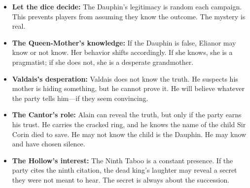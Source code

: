 \begin{itemize}
  \item \textbf{Let the dice decide:} The Dauphin's legitimacy is random each campaign. This prevents players from assuming they know the outcome. The mystery is real.
  \item \textbf{The Queen-Mother's knowledge:} If the Dauphin is false, Elianor may know or not know. Her behavior shifts accordingly. If she knows, she is a pragmatist; if she does not, she is a desperate grandmother.
  \item \textbf{Valdais's desperation:} Valdais does not know the truth. He suspects his mother is hiding something, but he cannot prove it. He will believe whatever the party tells him---if they seem convincing.
  \item \textbf{The Cantor's role:} Alain can reveal the truth, but only if the party earns his trust. He carries the cracked ring, and he knows the name of the child Sir Corin died to save. He may not know the child is the Dauphin. He may know and have chosen silence.
  \item \textbf{The Hollow's interest:} The Ninth Taboo is a constant presence. If the party cites the ninth citation, the dead king's laughter may reveal a secret they were not meant to hear. The secret is always about the succession.
\end{itemize}

